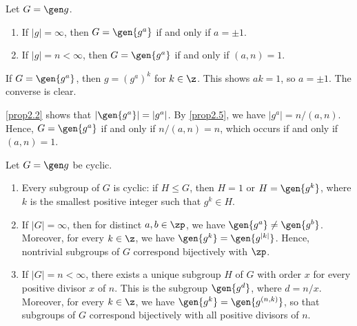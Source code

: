  \label{prop2.6}
Let $G = \gen g$.
\begin{enumerate}
    \item If $|g| = \infty$, then $G = \gen{g^a}$ if and only if $a = \pm 1$.
    \item If $|g| = n < \infty$, then $G = \gen{g^a}$ if and only if $(a, n) = 1$.
\end{enumerate}

\begin{proofnum}
    \item If $G = \gen{g^a}$, then $g = (g^a)^k$ for $k \in \z$. This shows $ak = 1$, so $a = \pm 1$. The converse is clear.
    \item \autoref{prop2.2} shows that $|\gen{g^a}| = |g^a|$. By \autoref{prop2.5}, we have $|g^a| = n/(a, n)$. Hence, $G = \gen{g^a}$ if and only if $n/(a, n) = n$, which occurs if and only if $(a, n) = 1$.
\end{proofnum}

 \label{theo2.7}
Let $G = \gen g$ be cyclic.
\begin{enumerate}
    \item Every subgroup of $G$ is cyclic: if $H \leq G$, then $H = 1$ or $H = \gen{g^k}$, where $k$ is the smallest positive integer such that $g^k \in H$.
    \item If $|G| = \infty$, then for distinct $a, b \in \zp$, we have $\gen{g^a} \neq \gen{g^b}$. Moreover, for every $k \in \z$, we have $\gen{g^k} = \gen{g^{|k|}}$. Hence, nontrivial subgroups of $G$ correspond bijectively with $\zp$.
    \item If $|G| = n < \infty$, there exists a unique subgroup $H$ of $G$ with order $x$ for every positive divisor $x$ of $n$. This is the subgroup $\gen{g^d}$, where $d = n/x$. Moreover, for every $k \in \z$, we have $\gen{g^k} = \gen{g^{(n, k)}}$, so that subgroups of $G$ correspond bijectively with all positive divisors of $n$.
\end{enumerate}

